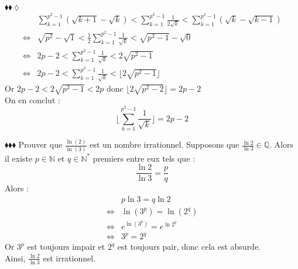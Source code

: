 \documentclass[11pt]{article}
\begin{document}
\begin{exercice}{$\blacklozenge\blacklozenge\lozenge$}{}
\begin{align*}
        &\sum^{p^2-1}_{k=1}{\left(\sqrt{k+1}-\sqrt{k}\right)}<\sum^{p^2-1}_{k=1}{\frac{1}{2\sqrt{k}}}<\sum^{p^2-1}_{k=1}{\left(\sqrt{k}-\sqrt{k-1}\right)}\\
        \iff&\sqrt{p^2}-\sqrt{1}<\frac{1}{2}\sum^{p^2-1}_{k=1}{\frac{1}{\sqrt{k}}}<\sqrt{p^2-1}-\sqrt{0}\\
        \iff&2p-2<\sum^{p^2-1}_{k=1}{\frac{1}{\sqrt{k}}}<2\sqrt{p^2-1}\\
        \iff&2p-2<\sum^{p^2-1}_{k=1}{\frac{1}{\sqrt{k}}}<\lfloor{2\sqrt{p^2-1}}\rfloor
    \end{align*}
    Or $2p-2<2\sqrt{p^2-1}<2p$ donc $\lfloor{2\sqrt{p^2-2}}\rfloor=2p-2$\\
    On en conclut : 
    \begin{equation*}
        \lfloor{\sum^{p^2-1}_{k=1}{\frac{1}{\sqrt{k}}}}\rfloor = 2p-2
    \end{equation*}
\end{exercice}

\begin{exercice}{$\blacklozenge\blacklozenge\blacklozenge$}{}
    Prouver que $\frac{\ln(2)}{\ln(3)}$ est un nombre irrationnel.
    \tcblower
    Supposons que $\frac{\ln{2}}{\ln{3}}\in\mathbb{Q}$. Alors il existe $p\in\mathbb{N}$ et $q\in\mathbb{N}^*$ premiers entre eux tels que :
    \begin{equation*}
        \frac{\ln{2}}{\ln{3}}=\frac{p}{q}
    \end{equation*}
    Alors :
    \begin{align*}
        &p\ln{3}=q\ln{2}\\
        \iff&\ln(3^p)=\ln(2^q)\\
        \iff&e^{\ln(3^p)}=e^{\ln{2^q}}\\
        \iff&3^p=2^q
    \end{align*}
    Or $3^p$ est toujours impair et $2^q$ est toujours pair, donc cela est absurde.\\
    Ainsi, $\frac{\ln2}{\ln3}$ est irrationnel.
\end{exercice}
\end{document}
